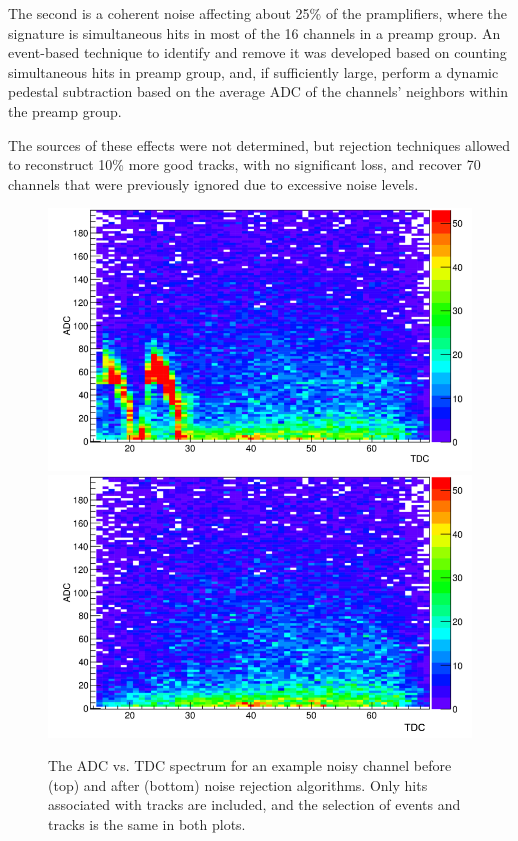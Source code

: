 \documentclass[twocolumn,showpacs,superscriptaddress,groupedaddress]{revtex4}
\begin{document}
The second is a coherent noise affecting about 25\% of the pramplifiers, where the signature is simultaneous hits in most of the 16 channels in a preamp group.   An event-based technique to identify and remove it was developed based on counting simultaneous hits in preamp group, and, if sufficiently large, perform a dynamic pedestal subtraction based on the average ADC of the channels' neighbors within the preamp group.

The sources of these effects were not determined, but rejection techniques allowed to reconstruct 10\% more good tracks, with no significant loss, and recover 70 channels that were previously ignored due to excessive noise levels.

\begin{figure}[tb]\centering
\includegraphics[scale=0.27]{fig/noisy_pad_before_rejection2.png}
\includegraphics[scale=0.27]{fig/noisy_pad_after_rejection2.png}
\caption{The ADC vs. TDC spectrum for an example noisy channel before (top) and after (bottom) noise rejection algorithms.  Only hits associated with tracks are included, and the selection of events and tracks is the same in both plots.}
\label{fig:noise}
\end{figure}
\end{document}
